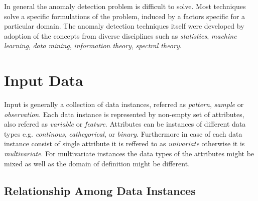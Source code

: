 In general the anomaly detection problem is difficult to solve. 
Most techniques solve a specific formulations of the problem, induced by a 
factors specific for a particular domain. The anomaly detection techniques itself
were developed by adoption of the concepts from diverse disciplines such as \emph{statistics}, 
\emph{machine learning}, \emph{data mining}, \emph{information theory}, \emph{spectral theory}.

\section{Input Data}

Input is generally a collection of data instances, referred as \emph{pattern}, 
\emph{sample} or \emph{observation}.
Each data instance is represented by non-empty set of attributes, also refered as 
\emph{variable} or \emph{feature}.
Attributes can be instances of different data types e.g. \emph{continous}, 
\emph{cathegorical}, or \emph{binary}.
Furthermore in case of each data instance consist of single attribute it is reffered to as
\emph{univariate} otherwise it is \emph{multivariate}. 
For multivariate instances the data types of the attributes might be mixed as well as 
the domain of definition might be different.

\subsection{Relationship Among Data Instances}

